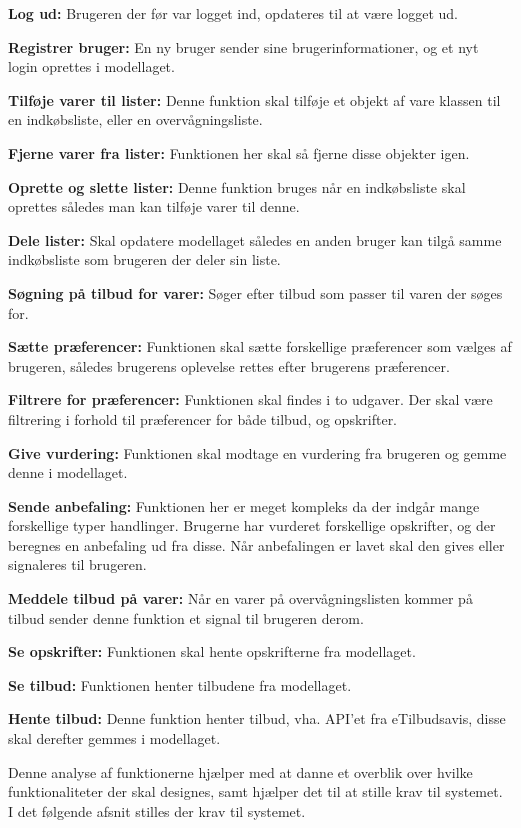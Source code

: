 \textbf{Log ud:} Brugeren der før var logget ind, opdateres til at være logget ud.

\textbf{Registrer bruger:} En ny bruger sender sine brugerinformationer, og et nyt login oprettes i modellaget.

\textbf{Tilføje varer til lister:} Denne funktion skal tilføje et objekt af vare klassen til en indkøbsliste, eller en overvågningsliste.

\textbf{Fjerne varer fra lister:} Funktionen her skal så fjerne disse objekter igen.

\textbf{Oprette og slette lister:} Denne funktion bruges når en indkøbsliste skal oprettes således man kan tilføje varer til denne.

\textbf{Dele lister:} Skal opdatere modellaget således en anden bruger kan tilgå samme indkøbsliste som brugeren der deler sin liste.

\textbf{Søgning på tilbud for varer:} Søger efter tilbud som passer til varen der søges for.

\textbf{Sætte præferencer:} Funktionen skal sætte forskellige præferencer som vælges af brugeren, således brugerens oplevelse rettes efter brugerens præferencer.

\textbf{Filtrere for præferencer:} Funktionen skal findes i to udgaver. Der skal være filtrering i forhold til præferencer for både tilbud, og opskrifter.

\textbf{Give vurdering:} Funktionen skal modtage en vurdering fra brugeren og gemme denne i modellaget.

\textbf{Sende anbefaling:} Funktionen her er meget kompleks da der indgår mange forskellige typer handlinger.
Brugerne har vurderet forskellige opskrifter, og der beregnes en anbefaling ud fra disse.
Når anbefalingen er lavet skal den gives eller signaleres til brugeren.

\textbf{Meddele tilbud på varer:} Når en varer på overvågningslisten kommer på tilbud sender denne funktion et signal til brugeren derom.

\textbf{Se opskrifter:} Funktionen skal hente opskrifterne fra modellaget.

\textbf{Se tilbud:} Funktionen henter tilbudene fra modellaget.

\textbf{Hente tilbud:} Denne funktion henter tilbud, vha. API'et fra eTilbudsavis, disse skal derefter gemmes i modellaget.

Denne analyse af funktionerne hjælper med at danne et overblik over hvilke funktionaliteter der skal designes, samt hjælper det til at stille krav til systemet.
I det følgende afsnit stilles der krav til systemet.
